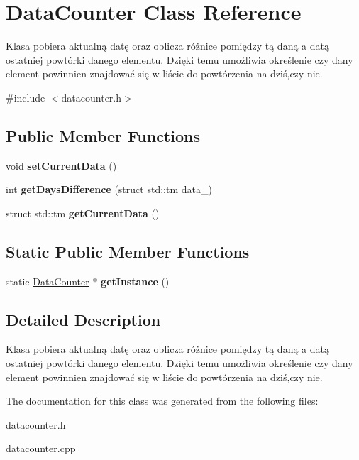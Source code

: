 \hypertarget{class_data_counter}{}\section{Data\+Counter Class Reference}
\label{class_data_counter}


Klasa pobiera aktualną datę oraz oblicza różnice pomiędzy tą daną a datą ostatniej powtórki danego elementu. Dzięki temu umożliwia określenie czy dany element powinnien znajdować się w liście do powtórzenia na dziś,czy nie.  




{\ttfamily \#include $<$datacounter.\+h$>$}

\subsection*{Public Member Functions}
\begin{DoxyCompactItemize}
\item 
\mbox{\label{class_data_counter_ad3b3cb7addf5e0dbb8d5a76220884717}} 
void {\bfseries set\+Current\+Data} ()
\item 
\mbox{\label{class_data_counter_adf801ff96f2fa290fa0d65ccfabd5d84}} 
int {\bfseries get\+Days\+Difference} (struct std\+::tm data\+\_\+)
\item 
\mbox{\label{class_data_counter_a698e215d52c6b1634397273877a14a24}} 
struct std\+::tm {\bfseries get\+Current\+Data} ()
\end{DoxyCompactItemize}
\subsection*{Static Public Member Functions}
\begin{DoxyCompactItemize}
\item 
\mbox{\label{class_data_counter_a92a2b021515881d1ed48249a88f4e1cf}} 
static \mbox{\hyperlink{class_data_counter}{Data\+Counter}} $\ast$ {\bfseries get\+Instance} ()
\end{DoxyCompactItemize}


\subsection{Detailed Description}
Klasa pobiera aktualną datę oraz oblicza różnice pomiędzy tą daną a datą ostatniej powtórki danego elementu. Dzięki temu umożliwia określenie czy dany element powinnien znajdować się w liście do powtórzenia na dziś,czy nie. 

The documentation for this class was generated from the following files\+:\begin{DoxyCompactItemize}
\item 
datacounter.\+h\item 
datacounter.\+cpp\end{DoxyCompactItemize}
